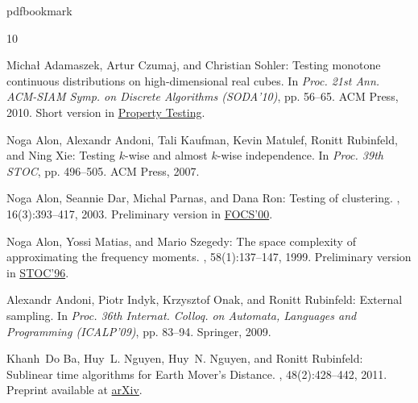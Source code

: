 %
%
%
%
%
\providecommand{\bibhead}[1]{}
%
\expandafter\ifx\csname pdfbookmark\endcsname\relax%
  \providecommand{\tocrefpdfbookmark}{}
\else\providecommand{\tocrefpdfbookmark}{%
   \hypertarget{tocreferences}{}%
   \pdfbookmark[1]{References}{tocreferences}}%
\fi

\tocrefpdfbookmark
\begin{thebibliography}{10}

\bibhead{ACS10}
{\sc Micha{\l} Adamaszek, Artur Czumaj, and Christian Sohler}: Testing monotone
  continuous distributions on high-dimensional real cubes.
\newblock In {\em Proc. 21st Ann. ACM-SIAM Symp. on Discrete Algorithms
  (SODA'10)}, pp. 56--65. ACM Press, 2010.
\newblock Short version in
  \href{http://dx.doi.org/10.1007/978-3-642-16367-8_13}{Property Testing}.

\bibhead{AAKMRX}
{\sc Noga Alon, Alexandr Andoni, Tali Kaufman, Kevin Matulef, Ronitt Rubinfeld,
  and Ning Xie}: Testing $k$-wise and almost $k$-wise independence.
\newblock In {\em Proc. 39th STOC}, pp. 496--505. ACM Press, 2007.
\newblock [\epfmtdoi{10.1145/1250790.1250863}]

\bibhead{ADPR}
{\sc Noga Alon, Seannie Dar, Michal Parnas, and Dana Ron}: Testing of
  clustering.
, 16(3):393--417, 2003.
\newblock Preliminary version in
  \href{http://dx.doi.org/10.1109/SFCS.2000.892111}{FOCS'00}.
\newblock [\epfmtdoi{10.1137/S0895480102410973}]

\bibhead{AlonMS99}
{\sc Noga Alon, Yossi Matias, and Mario Szegedy}: The space complexity of
  approximating the frequency moments.
, 58(1):137--147, 1999.
\newblock Preliminary version in
  \href{http://dx.doi.org/10.1145/237814.237823}{STOC'96}.

\bibhead{AIOR}
{\sc Alexandr Andoni, Piotr Indyk, Krzysztof Onak, and Ronitt Rubinfeld}:
  External sampling.
\newblock In {\em Proc. 36th Internat. Colloq. on Automata, Languages and
  Programming (ICALP'09)}, pp. 83--94. Springer, 2009.
\newblock [\epfmtdoi{10.1007/978-3-642-02927-1\_9}]

\bibhead{DNNR09}
{\sc Khanh~Do Ba, Huy~L. Nguyen, Huy~N. Nguyen, and Ronitt Rubinfeld}:
  Sublinear time algorithms for {E}arth {M}over's {D}istance.
, 48(2):428--442, 2011.
\newblock Preprint available at \href{http://arxiv.org/abs/0904.0292}{arXiv}.
\newblock [\epfmtdoi{10.1007/s00224-010-9265-8}]


\end{thebibliography}
